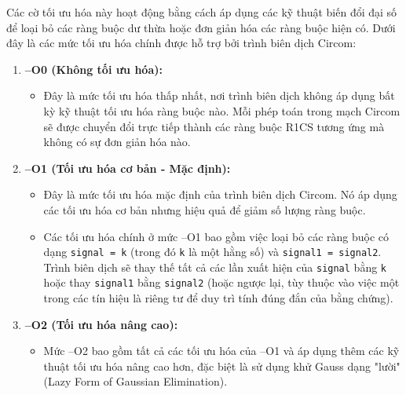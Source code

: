 Các cờ tối ưu hóa này hoạt động bằng cách áp dụng các kỹ thuật biến đổi đại số để loại bỏ các ràng buộc dư thừa hoặc đơn giản hóa các ràng buộc hiện có. Dưới đây là các mức tối ưu hóa chính được hỗ trợ bởi trình biên dịch Circom:

\begin{enumerate}
    \item \textbf{--O0 (Không tối ưu hóa):}
    \begin{itemize}
        \item Đây là mức tối ưu hóa thấp nhất, nơi trình biên dịch không áp dụng bất kỳ kỹ thuật tối ưu hóa ràng buộc nào. Mỗi phép toán trong mạch Circom sẽ được chuyển đổi trực tiếp thành các ràng buộc R1CS tương ứng mà không có sự đơn giản hóa nào.
    \end{itemize}
    \item \textbf{--O1 (Tối ưu hóa cơ bản - Mặc định):}
    \begin{itemize}
        \item Đây là mức tối ưu hóa mặc định của trình biên dịch Circom. Nó áp dụng các tối ưu hóa cơ bản nhưng hiệu quả để giảm số lượng ràng buộc.
        \item Các tối ưu hóa chính ở mức --O1 bao gồm việc loại bỏ các ràng buộc có dạng \texttt{signal = k} (trong đó \texttt{k} là một hằng số) và \texttt{signal1 = signal2}. Trình biên dịch sẽ thay thế tất cả các lần xuất hiện của \texttt{signal} bằng \texttt{k} hoặc thay \texttt{signal1} bằng \texttt{signal2} (hoặc ngược lại, tùy thuộc vào việc một trong các tín hiệu là riêng tư để duy trì tính đúng đắn của bằng chứng).
    \end{itemize}
    \item \textbf{--O2 (Tối ưu hóa nâng cao):}
    \begin{itemize}
        \item Mức --O2 bao gồm tất cả các tối ưu hóa của --O1 và áp dụng thêm các kỹ thuật tối ưu hóa nâng cao hơn, đặc biệt là sử dụng khử Gauss dạng "lười" (Lazy Form of Gaussian Elimination).

\end{itemize}
\end{enumerate}
